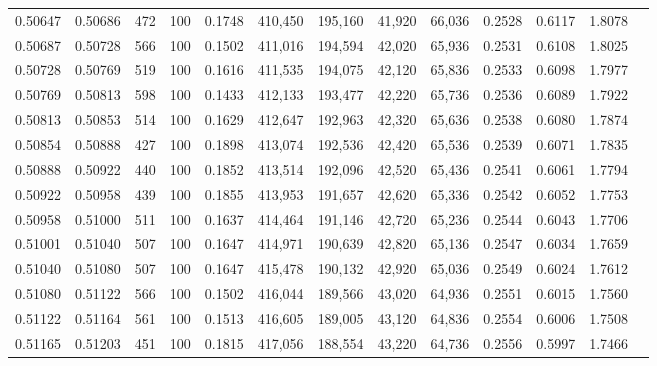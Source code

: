 \begin{tabular}{rrrrrrrrrrrrr}
0.50647 & 0.50686 &   472 & 100 &                                     0.1748 & 410,450 & 195,160 &  41,920 &  66,036 & 0.2528 & 0.6117 & 1.8078 \\
0.50687 & 0.50728 &   566 & 100 &                                     0.1502 & 411,016 & 194,594 &  42,020 &  65,936 & 0.2531 & 0.6108 & 1.8025 \\
0.50728 & 0.50769 &   519 & 100 &                                     0.1616 & 411,535 & 194,075 &  42,120 &  65,836 & 0.2533 & 0.6098 & 1.7977 \\
0.50769 & 0.50813 &   598 & 100 &                                     0.1433 & 412,133 & 193,477 &  42,220 &  65,736 & 0.2536 & 0.6089 & 1.7922 \\
0.50813 & 0.50853 &   514 & 100 &                                     0.1629 & 412,647 & 192,963 &  42,320 &  65,636 & 0.2538 & 0.6080 & 1.7874 \\
0.50854 & 0.50888 &   427 & 100 &                                     0.1898 & 413,074 & 192,536 &  42,420 &  65,536 & 0.2539 & 0.6071 & 1.7835 \\
0.50888 & 0.50922 &   440 & 100 &                                     0.1852 & 413,514 & 192,096 &  42,520 &  65,436 & 0.2541 & 0.6061 & 1.7794 \\
0.50922 & 0.50958 &   439 & 100 &                                     0.1855 & 413,953 & 191,657 &  42,620 &  65,336 & 0.2542 & 0.6052 & 1.7753 \\
0.50958 & 0.51000 &   511 & 100 &                                     0.1637 & 414,464 & 191,146 &  42,720 &  65,236 & 0.2544 & 0.6043 & 1.7706 \\
0.51001 & 0.51040 &   507 & 100 &                                     0.1647 & 414,971 & 190,639 &  42,820 &  65,136 & 0.2547 & 0.6034 & 1.7659 \\
0.51040 & 0.51080 &   507 & 100 &                                     0.1647 & 415,478 & 190,132 &  42,920 &  65,036 & 0.2549 & 0.6024 & 1.7612 \\
0.51080 & 0.51122 &   566 & 100 &                                     0.1502 & 416,044 & 189,566 &  43,020 &  64,936 & 0.2551 & 0.6015 & 1.7560 \\
0.51122 & 0.51164 &   561 & 100 &                                     0.1513 & 416,605 & 189,005 &  43,120 &  64,836 & 0.2554 & 0.6006 & 1.7508 \\
0.51165 & 0.51203 &   451 & 100 &                                     0.1815 & 417,056 & 188,554 &  43,220 &  64,736 & 0.2556 & 0.5997 & 1.7466 \\

\end{tabular}

